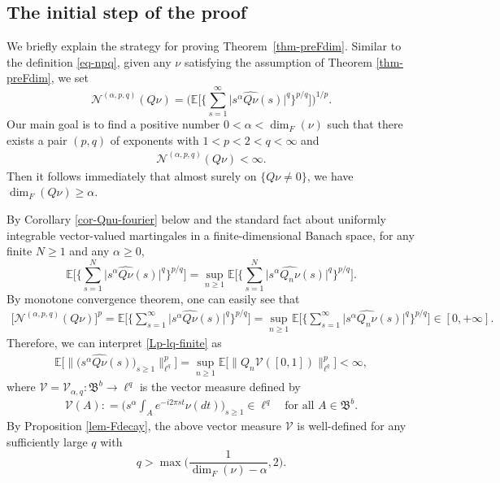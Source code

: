 \documentclass[12pt]{amsart}
\theoremstyle{definition}
\theoremstyle{remark}
\newcommand{\E}{\mathbb{E}}
\newcommand{\NQ}{\mathcal{N}^{(\alpha, p, q)}}
\numberwithin{equation}{section}
\begin{document}
\subsection{The initial step of the proof}\label{sec-initial-one}
We briefly explain the strategy for proving Theorem~\ref{thm-preFdim}.   Similar to the definition \eqref{eq-npq},   given any  $\nu$ satisfying the assumption of Theorem \ref{thm-preFdim}, we set 
\[
\NQ(Q\nu)  = \Big(\E\Big[\Big\{\sum_{s =  1}^\infty \big|s^{\alpha} \widehat{Q\nu}(s)\big|^q\Big\}^{p/q}\Big]\Big)^{1/p}.
\]
 Our main goal is to find a positive number $0< \alpha<\dim_F(\nu)$ such that  there exists a pair $(p, q)$ of exponents with  $1<p<2<q<\infty$ and  
\begin{align}\label{Lp-lq-finite}
\NQ(Q\nu)  <\infty. 
\end{align}
Then it follows immediately that almost surely on $\{Q\nu\ne 0\}$,  we have 
$
\dim_F(Q\nu) \ge \alpha. 
$

By Corollary \ref{cor-Qnu-fourier} below and the standard fact about uniformly integrable vector-valued martingales in a finite-dimensional Banach space, for any finite  $N\ge 1$ and any $\alpha\ge 0$, 
\[
\E\Big[\Big\{\sum_{s =  1}^N \big|s^{\alpha} \widehat{Q\nu}(s)\big|^q\Big\}^{p/q}\Big]  = \sup_{n\ge 1}  \E\Big[\Big\{\sum_{s =  1}^N \big|s^{\alpha} \widehat{Q_n\nu}(s)\big|^q\Big\}^{p/q}\Big]. 
\]
By monotone convergence theorem, one can easily see that
\begin{align}\label{sup=infty}
\big[\NQ(Q\nu)\big]^p =  \E\Big[\Big\{\sum_{s =  1}^\infty \big|s^{\alpha} \widehat{Q\nu}(s)\big|^q\Big\}^{p/q}\Big]  = \sup_{n\ge 1}  \E\Big[\Big\{\sum_{s =  1}^\infty \big|s^{\alpha} \widehat{Q_n\nu}(s)\big|^q\Big\}^{p/q}\Big] \in [0,+\infty]. 
\end{align}
Therefore,  we  can  interpret \eqref{Lp-lq-finite} as 
\begin{align}\label{goal-ineq}
 \E\Big[  \Big\| \Big( s^\alpha \widehat{Q\nu}(s)\Big)_{s\ge 1} \Big\|_{\ell^q}^p \Big]  =   \sup_{n\ge 1}\E\Big[  \big\| Q_n \mathcal{V}([0,1])\big\|_{\ell^q}^p \Big]<\infty,
\end{align}
where $\mathcal{V} = \mathcal{V}_{\alpha, q}: \mathfrak{B}^b \rightarrow \ell^q$ is the vector measure defined by 
 \begin{align}\label{def-Valpha}
\mathcal{V}(A): =   \Big( s^\alpha \int_{A}e^{-i 2\pi st}\nu(dt) \Big)_{s\ge 1} \in \ell^q \quad \text{for all $A\in \mathfrak{B}^b$}.
\end{align}
By Proposition \ref{lem-Fdecay}, 
the above vector measure $\mathcal{V}$ is well-defined for any sufficiently large $q$ with 
\[
q> \max\Big( \frac{1}{\dim_F(\nu)- \alpha}, 2\Big).
\] 
\end{document}
